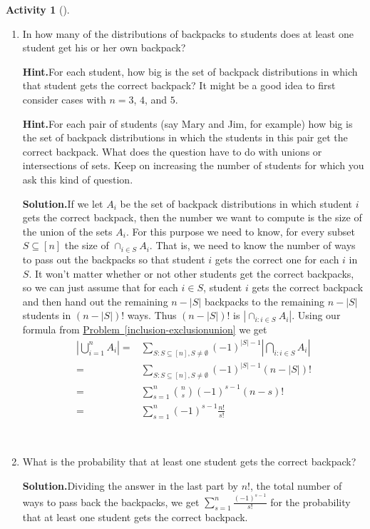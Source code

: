 \documentclass[10pt,]{book}
\theoremstyle{plain}
\theoremstyle{definition}
\newtheorem{activity}[project]{Activity}
\numberwithin{equation}{chapter}
\newcommand{\amp}{&}
\begin{document}
\begin{activity}[]
\begin{enumerate}[label=(\alph*)]
~\par
\item In how many of the distributions of backpacks to students does at least one student get his or her own backpack?%
\par\medskip\noindent%
\textbf{Hint.}\quad For each student, how big is the set of backpack distributions in which that student gets the correct backpack?  It might be a good idea to first consider cases with \(n=3\), \(4\), and \(5\).%
\par\medskip\noindent%
\textbf{Hint.}\quad For each pair of students (say Mary and Jim, for example) how big is the set of backpack distributions in which the students in this pair get the correct backpack. What does the question have to do with unions or intersections of sets. Keep on increasing the number of students for which you ask this kind of question.%
\par\medskip\noindent%
\textbf{Solution.}\quad If we let \(A_i\) be the set of backpack distributions in which student \(i\) gets the correct backpack, then the number we want to compute is the size of the union of the sets \(A_i\). For this purpose we need to know, for every subset \(S\subseteq [n]\) the size of \(\cap_{i\in S}A_i\). That is, we need to know the number of ways to pass out the backpacks so that student \(i\) gets the correct one for each \(i\) in \(S\). It won't matter whether or not other students get the correct backpacks, so we can just assume that for each \(i\in S\), student \(i\) gets the correct backpack and then hand out the remaining \(n-|S|\) backpacks to the remaining \(n-|S|\) students in \((n-|S|)!\) ways. Thus \((n-|S|)!\) is \(|\cap_{i:i\in S}A_i|\). Using our formula from \hyperref[inclusion-exclusionunion]{Problem~\ref{inclusion-exclusionunion}} we get%
\begin{align*}
\left|\bigcup_{i=1}^n A_i \right|  =\amp  \sum_{S:
S\subseteq [n], S\not=\emptyset}
(-1)^{|S|-1}\left|\bigcap_{i:i\in S} A_i \right|\\
=\amp \sum_{S:
S\subseteq [n], S\not=\emptyset}(-1)^{|S|-1} (n-|S|)!\\
=\amp
\sum_{s=1}^n \binom{n}{s}(-1)^{s-1}(n-s)!\\
=\amp \sum_{s=1}^n
(-1)^{s-1}\frac{n!}{s!}
\end{align*}
%

~\par
\item What is the probability that at least one student gets the correct backpack?%
\par\medskip\noindent%
\textbf{Solution.}\quad Dividing the answer in the last part by \(n!\), the total number of ways to pass back the backpacks, we get \(\sum_{s=1}^n \frac{(-1)^{s-1}}{s!}\) for the probability that at least one student gets the correct backpack.%


\end{enumerate}
\end{activity}
\end{document}

